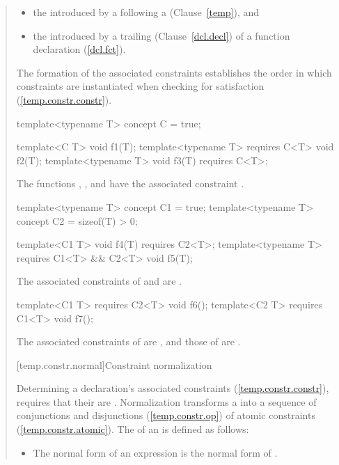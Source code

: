 \begin{quote}
\begin{addedblock}
\begin{itemize}
\begin{itemize}
\item the  introduced
      by a  following a 
       (Clause~\ref{temp}), and

\item the  introduced by a trailing 
       (Clause~\ref{dcl.decl}) 
      of a function declaration (\ref{dcl.fct}).
\end{itemize}
\end{itemize}
% 
The formation of the associated constraints
establishes the order in which constraints are instantiated when checking 
for satisfaction (\ref{temp.constr.constr}).
% 
\enterexample
\begin{codeblock}
template<typename T> concept C = true;

template<C T> void f1(T);
template<typename T> requires C<T> void f2(T);
template<typename T> void f3(T) requires C<T>;
\end{codeblock}
The functions , , and  have the associated
constraint .
% 
\begin{codeblock}
template<typename T> concept C1 = true;
template<typename T> concept C2 = sizeof(T) > 0;

template<C1 T> void f4(T) requires C2<T>;
template<typename T> requires C1<T> && C2<T> void f5(T);
\end{codeblock}
The associated constraints of  and 
are .
% 
\begin{codeblock}
template<C1 T> requires C2<T> void f6();
template<C2 T> requires C1<T> void f7();
\end{codeblock}
The associated constraints of 
 are ,
and those of 
 are .
\exitexample

[temp.constr.normal]{Constraint normalization}

\pnum
Determining a declaration's
associated constraints (\ref{temp.constr.constr}), 
requires that their 
are .
% 
Normalization transforms a  into a 
sequence of conjunctions and disjunctions (\ref{temp.constr.op})
of atomic constraints (\ref{temp.constr.atomic}).
% 
The  of an   is 
defined as follows:
% 
\begin{itemize}
\item The normal form of an expression  is the normal form
of .


\end{itemize}
\end{addedblock}
\end{quote}

